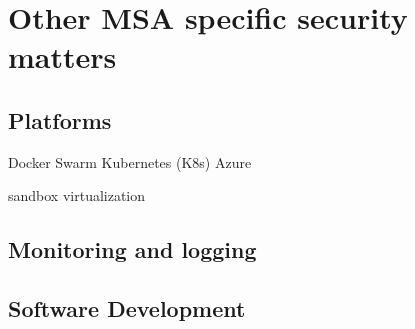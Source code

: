 \section{Other MSA specific security matters}




\subsection{Platforms}
\begin{sloppypar}

\end{sloppypar}

Docker Swarm
Kubernetes (K8s)
Azure

sandbox
virtualization 

\subsection{Monitoring and logging}




\subsection{Software Development}




